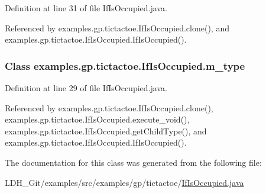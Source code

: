 Definition at line 31 of file If\-Is\-Occupied.\-java.



Referenced by examples.\-gp.\-tictactoe.\-If\-Is\-Occupied.\-clone(), and examples.\-gp.\-tictactoe.\-If\-Is\-Occupied.\-If\-Is\-Occupied().

\hypertarget{classexamples_1_1gp_1_1tictactoe_1_1_if_is_occupied_aaa243ec54bc5cae35cd021f5900579de}{
\subsubsection[{m\-\_\-type}]{\setlength{\rightskip}{0pt plus 5cm}Class examples.\-gp.\-tictactoe.\-If\-Is\-Occupied.\-m\-\_\-type\hspace{0.3cm}{\ttfamily [private]}}}\label{classexamples_1_1gp_1_1tictactoe_1_1_if_is_occupied_aaa243ec54bc5cae35cd021f5900579de}


Definition at line 29 of file If\-Is\-Occupied.\-java.



Referenced by examples.\-gp.\-tictactoe.\-If\-Is\-Occupied.\-clone(), examples.\-gp.\-tictactoe.\-If\-Is\-Occupied.\-execute\-\_\-void(), examples.\-gp.\-tictactoe.\-If\-Is\-Occupied.\-get\-Child\-Type(), and examples.\-gp.\-tictactoe.\-If\-Is\-Occupied.\-If\-Is\-Occupied().



The documentation for this class was generated from the following file\-:\begin{DoxyCompactItemize}
\item 
L\-D\-H\-\_\-\-Git/examples/src/examples/gp/tictactoe/\hyperlink{_if_is_occupied_8java}{If\-Is\-Occupied.\-java}\end{DoxyCompactItemize}

